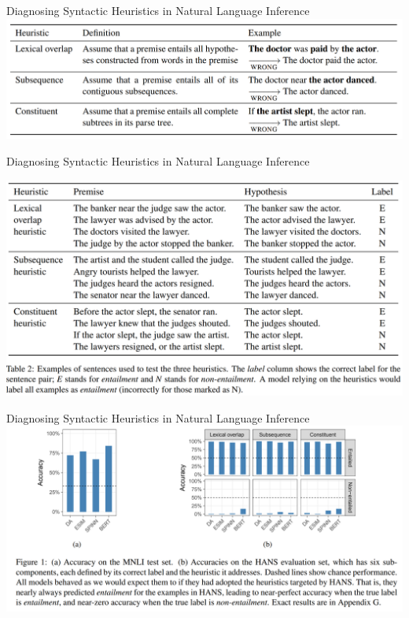 \begin{vbframe}{Diagnosing Syntactic Heuristics in Natural Language Inference}
	\vfill
	\includegraphics[width=\textwidth]{evaluation_figures/nli_start.png}
	\vfill
\end{vbframe}

\begin{vbframe}{Diagnosing Syntactic Heuristics in Natural Language Inference}

	\includegraphics[width=\textwidth]{evaluation_figures/nli_examples.png}
\end{vbframe}

\begin{vbframe}{Diagnosing Syntactic Heuristics in Natural Language Inference}
	\vfill
	\includegraphics[width=\textwidth]{evaluation_figures/nli_results.png}
	\vfill
\end{vbframe}

